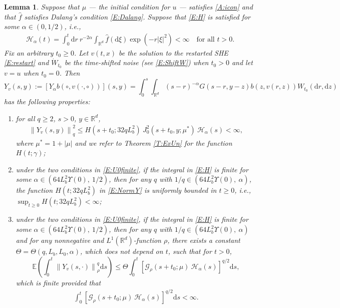 \documentclass[12pt]{report}
\theoremstyle{plain}
\newtheorem{lemma}[theorem]{Lemma}
\theoremstyle{definition}
\numberwithin{equation}{section}
\newcommand{\R}{\mathbb{R}}
\newcommand{\E}{\mathbb{E}}
\newcommand{\Norm}[1]{\left\|  #1   \right\|}
\newcommand{\ud}{\ensuremath{ \mathrm{d} }}
\begin{document}
\begin{lemma} \label{L:yineq}
	Suppose that $\mu$ --- the initial condition for $u$ --- satisfies \eqref{A:icon} and that
	$\widehat{f}$ satisfies Dalang's condition \eqref{E:Dalang}. Suppose that \eqref{E:H} is satisfied for some $\alpha\in
	(0,1/2)$, i.e.,
	\begin{align*} 
	\mathcal{H}_\alpha(t) = \int_0^t \ud r \: r^{-2\alpha} \int_{\R^{d}} \widehat{f}(\ud \xi) \exp\left(-r|\xi|^2 \right) < \infty
	\quad \text{for all $t>0$}.
	\end{align*}
	Fix an arbitrary $ t_0\ge 0$. Let $v(t,x)$ be the solution to the restarted SHE \eqref{E:restart}
	and $\dot{W}_{t_0}$ be the time-shifted noise (see \eqref{E:ShiftW}) when $t_0>0$ and let $v=u$
	when $ t_0=0$. Then
	\begin{equation} \label{E:Y}
	Y_v(s,y) := \left[Y_\alpha b\left(\circ, v(\cdot,\circ)\right)\right](s,y)
	= \int_0^s \int_{\R^d} (s-r)^{-\alpha}G(s-r,y-z)b(z,v(r,z))W_{t_0}(\ud r,\ud z)
	\end{equation}
	has the following properties:
	
	\begin{enumerate}[(1)]
		\item for all $q\ge 2$, $s>0$, $y\in\R^d$,
		\begin{align} \label{E:NormY}
		\Norm{Y_v(s,y)}_q^2 \le H\left(s+t_0;32qL_b^2\right) \: J_0^2(s + t_0,y;\mu^*)\: \mathcal{H}_\alpha(s)<\infty,
		\end{align}
		where $\mu^* = 1 + |\mu|$ and we refer to Theorem \ref{T:ExUn} for the function $H\left(t;\gamma\right)$;
		\item under the two conditions in \eqref{E:U0finite}, if the integral in \eqref{E:H} is finite for
		some $\alpha\in \left(64 L_b^2 \Upsilon(0),\: 1/2\right)$, then for any $q$ with $1/q\in
		\left(64 L_b^2 \Upsilon(0), \: \alpha\right)$, the function $H\left(t;32qL_b^2\right)$ in
		\eqref{E:NormY} is uniformly bounded in $t\ge 0$, i.e., $\sup_{t\ge
			0}H\left(t;32qL_b^2\right)<\infty$; 
		\item under the two conditions in \eqref{E:U0finite}, if the integral in \eqref{E:H} is finite for
		some $\alpha\in \left(64 L_b^2 \Upsilon(0),\: 1/2\right)$, then for any $q$ with $1/q\in
		\left(64 L_b^2 \Upsilon(0), \: \alpha\right)$ and for any nonnegative and
		$L^1(\R^d)$-function $\rho$, there exists a constant $\Theta =
		\Theta\left(q,L_b,L_0,\alpha\right)$, which does not depend on $t$, such that for $t>0$,
		\begin{equation} \label{E:yineq}
		\E \left(\int_0^{t} \Norm{Y_v(s,\cdot)}_{\rho}^q \ud s\right)
		\le \Theta \int_0^t \left[\mathcal{G}_{\rho}(s + t_0;\mu)\: \mathcal{H}_\alpha(s)\right]^{q/2} \ud s,
		\end{equation}
		which is finite provided that
		\begin{align} \label{E:GH-int'}
		\int_{0}^t \left[\mathcal{G}_{\rho}(s + t_0;\mu)\:\mathcal{H}_\alpha(s)\right]^{q/2} \ud s <\infty.
		\end{align}
	\end{enumerate}
\end{lemma}
\end{document}
